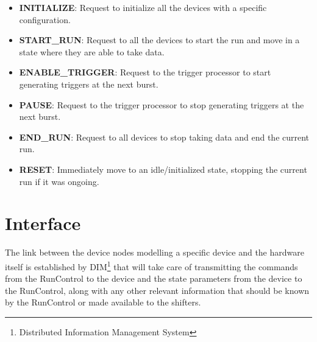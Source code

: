 \documentclass[a4paper]{article}
\begin{document}
\begin{itemize}
	\item \textbf{INITIALIZE}: Request to initialize all the devices with a specific configuration.
	\item \textbf{START\_RUN}: Request to all the devices to start the run and move in a state
	where they are able to take data.
	\item \textbf{ENABLE\_TRIGGER}: Request to the trigger processor to start
	generating triggers at the next burst.
	\item \textbf{PAUSE}: Request to the trigger processor to stop generating
	triggers at the next burst.
	\item \textbf{END\_RUN}: Request to all devices to stop taking data and end the current run.
	\item \textbf{RESET}: Immediately move to an idle/initialized state, stopping the current run if it
	was ongoing.
\end{itemize}

\section{Interface}
The link between the device nodes modelling a specific device and the hardware itself is
established by DIM\cite{biblio:DIM}\footnote{Distributed Information Management System} that will
take care of transmitting the commands from the RunControl to the device and the state parameters from the
device to the RunControl, along with any other relevant information that should be known by the
RunControl or made available to the shifters.
\end{document}
